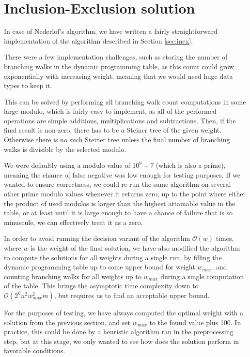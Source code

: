 \documentclass[thesis=M,english,hidelinks]{FITthesis}[2012/10/20]
\theoremstyle{definition}
\begin{document}
\section{Inclusion-Exclusion solution}
In case of Nederlof's algorithm, we have written a fairly straightforward implementation of the algorithm described in
Section \ref{sec:inex}.

There were a few implementation challenges, such as storing the number of branching walks in the dynamic programming
table, as this count could grow exponentially with increasing weight, meaning that we would need huge data types to keep
it.

This can be solved by performing all branching walk count computations in some large modulo, which is fairly easy to
implement, as all of the performed operations are simple additions, multiplications and subtractions. Then, if the final
result is non-zero, there has to be a Steiner tree of the given weight. Otherwise there is no such Steiner tree unless
the final number of branching walks is divisible by the selected modulo.

We were defaultly using a modulo value of $10^9 + 7$ (which is also a prime), meaning the chance of false negative was
low enough for testing purposes. If we wanted to ensure correctness, we could re-run the same algorithm on several other
prime modulo values whenever it returns zero, up to the point where either the product of used modulos is larger than
the highest attainable value in the table, or at least until it is large enough to have a chance of failure that is so
minuscule, we can effectively treat it as a zero.

In order to avoid running the decision variant of the algorithm $\mathcal{O}(w)$ times, where $w$ is the weight of the
final solution, we have also modified the algorithm to compute the solutions for all weights during a single run, by
filling the dynamic programming table up to some upper bound for weight $w_{max}$, and counting branching walks for
all weights up to $w_{max}$ during a single computation of the table. This brings the asymptotic time complexity down to 
$\mathcal{O}(2^k n^2 w_{max}^2 m)$, but requires us to find an acceptable upper bound.

For the purposes of testing, we have always computed the optimal weight with a solution from the previous section,
and set $w_{max}$ to the found value plus 100. In practice, this could be done by a heuristic algorithm ran in the
preprocessing step, but at this stage, we only wanted to see how does the solution perform in favorable conditions.
\end{document}
